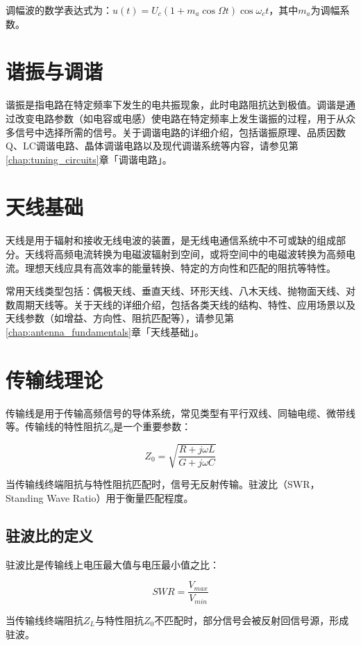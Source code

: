 调幅波的数学表达式为：$u(t) = U_c(1 + m_a\cos\Omega t)\cos\omega_c t$，其中$m_a$为调幅系数。

\section{谐振与调谐}
\label{sec:resonance_tuning}

谐振是指电路在特定频率下发生的电共振现象，此时电路阻抗达到极值。调谐是通过改变电路参数（如电容或电感）使电路在特定频率上发生谐振的过程，用于从众多信号中选择所需的信号。关于调谐电路的详细介绍，包括谐振原理、品质因数Q、LC调谐电路、晶体调谐电路以及现代调谐系统等内容，请参见第\ref{chap:tuning_circuits}章「调谐电路」。

\section{天线基础}
\label{sec:antenna_fundamentals}

天线是用于辐射和接收无线电波的装置，是无线电通信系统中不可或缺的组成部分。天线将高频电流转换为电磁波辐射到空间，或将空间中的电磁波转换为高频电流。理想天线应具有高效率的能量转换、特定的方向性和匹配的阻抗等特性。

常用天线类型包括：偶极天线、垂直天线、环形天线、八木天线、抛物面天线、对数周期天线等。关于天线的详细介绍，包括各类天线的结构、特性、应用场景以及天线参数（如增益、方向性、阻抗匹配等），请参见第\ref{chap:antenna_fundamentals}章「天线基础」。

\section{传输线理论}
\label{sec:transmission_line}

传输线是用于传输高频信号的导体系统，常见类型有平行双线、同轴电缆、微带线等。传输线的特性阻抗$Z_0$是一个重要参数：

\[ Z_0 = \sqrt{\frac{R + j\omega L}{G + j\omega C}} \]

当传输线终端阻抗与特性阻抗匹配时，信号无反射传输。驻波比（SWR，Standing Wave Ratio）用于衡量匹配程度。

\subsection{驻波比的定义}
\label{sec:swr_definition}

驻波比是传输线上电压最大值与电压最小值之比：

\[ SWR = \frac{V_{max}}{V_{min}} \]

当传输线终端阻抗$Z_L$与特性阻抗$Z_0$不匹配时，部分信号会被反射回信号源，形成驻波。

